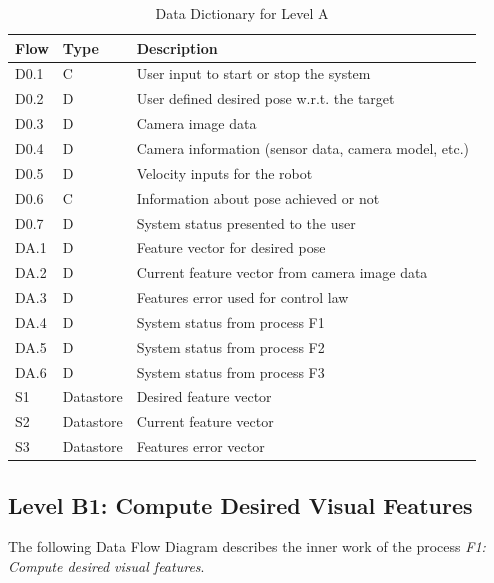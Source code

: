 \begin{table}[!htb]
	\centering
	\begin{tabular}{lll}
		\toprule
		Flow & Type & Description \\
		\midrule
		D0.1 & C & User input to start or stop the system \\
		D0.2 & D & User defined desired pose w.r.t. the target \\
		D0.3 & D & Camera image data \\
		D0.4 & D & Camera information (sensor data, camera model, etc.) \\
		D0.5 & D & Velocity inputs for the robot \\
		D0.6 & C & Information about pose achieved or not \\
		D0.7 & D & System status presented to the user \\
		\midrule
		DA.1 & D & Feature vector for desired pose \\
		DA.2 & D & Current feature vector from camera image data \\
		DA.3 & D & Features error used for control law \\
		DA.4 & D & System status from process F1 \\
		DA.5 & D & System status from process F2 \\
		DA.6 & D & System status from process F3 \\
		\midrule
		S1 & Datastore & Desired feature vector \\
		S2 & Datastore & Current feature vector \\
		S3 & Datastore & Features error vector \\
		\bottomrule
	\end{tabular}
\caption{Data Dictionary for Level A}
\label{tab:DD-LA}
\end{table}

\pagebreak

\subsection{Level B1: Compute Desired Visual Features}
\label{sec:level-B1}


The following Data Flow Diagram describes the inner work of the process \textit{F1: Compute desired visual features}.


